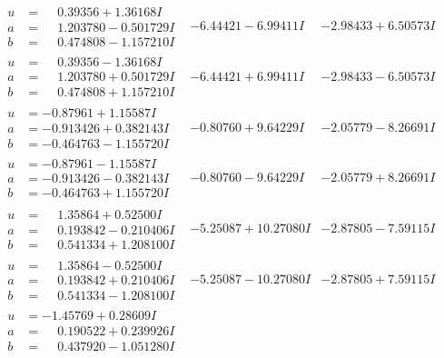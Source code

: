 \documentclass[1p]{elsarticle_modified}
\theoremstyle{definition}
\begin{document}
$$\begin{array}{c|c|c}
\begin{aligned}
u &= \phantom{-}0.39356 + 1.36168 I \\
a &= \phantom{-}1.203780 - 0.501729 I \\
b &= \phantom{-}0.474808 - 1.157210 I\end{aligned}
 & -6.44421 - 6.99411 I & -2.98433 + 6.50573 I \\ \hline\begin{aligned}
u &= \phantom{-}0.39356 - 1.36168 I \\
a &= \phantom{-}1.203780 + 0.501729 I \\
b &= \phantom{-}0.474808 + 1.157210 I\end{aligned}
 & -6.44421 + 6.99411 I & -2.98433 - 6.50573 I \\ \hline\begin{aligned}
u &= -0.87961 + 1.15587 I \\
a &= -0.913426 + 0.382143 I \\
b &= -0.464763 - 1.155720 I\end{aligned}
 & -0.80760 + 9.64229 I & -2.05779 - 8.26691 I \\ \hline\begin{aligned}
u &= -0.87961 - 1.15587 I \\
a &= -0.913426 - 0.382143 I \\
b &= -0.464763 + 1.155720 I\end{aligned}
 & -0.80760 - 9.64229 I & -2.05779 + 8.26691 I \\ \hline\begin{aligned}
u &= \phantom{-}1.35864 + 0.52500 I \\
a &= \phantom{-}0.193842 - 0.210406 I \\
b &= \phantom{-}0.541334 + 1.208100 I\end{aligned}
 & -5.25087 + 10.27080 I & -2.87805 - 7.59115 I \\ \hline\begin{aligned}
u &= \phantom{-}1.35864 - 0.52500 I \\
a &= \phantom{-}0.193842 + 0.210406 I \\
b &= \phantom{-}0.541334 - 1.208100 I\end{aligned}
 & -5.25087 - 10.27080 I & -2.87805 + 7.59115 I \\ \hline\begin{aligned}
u &= -1.45769 + 0.28609 I \\
a &= \phantom{-}0.190522 + 0.239926 I \\
b &= \phantom{-}0.437920 - 1.051280 I\end{aligned}

\end{array}$$
\end{document}
